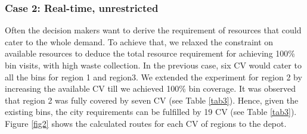 \documentclass[12pt]{article}
\begin{document}
\subsubsection*{Case 2: Real-time, unrestricted}

Often the decision makers want to derive the requirement of resources that could cater to the whole demand. To achieve that, we relaxed the constraint on available resources to deduce the total resource requirement for achieving 100\% bin visits, with high waste collection. In the previous case, six CV would cater to all the bins for region 1 and region3. We extended the experiment for region 2 by increasing the available CV till we achieved 100\% bin coverage. It was observed that region 2 was fully covered by seven CV (see Table \ref{tab3}). Hence, given the existing bins, the city requirements can be fulfilled by 19 CV (see Table \ref{tab3}). Figure \ref{fig2} shows the calculated routes for each CV of regions to the depot. 
\end{document}
